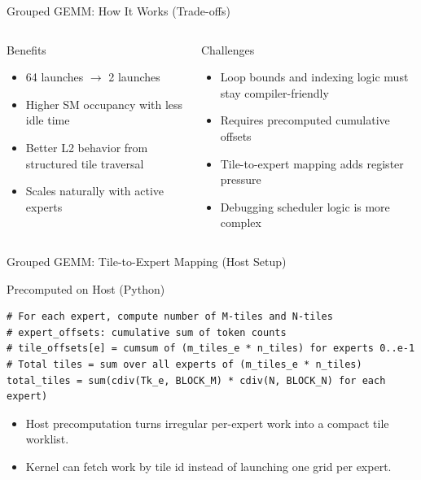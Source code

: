 \documentclass[aspectratio=169,11pt]{beamer}
\begin{document}
\begin{frame}[t]{Grouped GEMM: How It Works (Trade-offs)}
\begin{columns}[T]
\begin{block}{Benefits}
\begin{itemize}
    \item 64 launches $\to$ 2 launches
    \item Higher SM occupancy with less idle time
    \item Better L2 behavior from structured tile traversal
    \item Scales naturally with active experts
\end{itemize}
\end{block}

\begin{alertblock}{Challenges}
\begin{itemize}
    \item Loop bounds and indexing logic must stay compiler-friendly
    \item Requires precomputed cumulative offsets
    \item Tile-to-expert mapping adds register pressure
    \item Debugging scheduler logic is more complex
\end{itemize}
\end{alertblock}
\end{columns}
\end{frame}

\begin{frame}[fragile,t]{Grouped GEMM: Tile-to-Expert Mapping (Host Setup)}
\small
\begin{block}{Precomputed on Host (Python)}
\begin{lstlisting}[basicstyle=\ttfamily\scriptsize]
# For each expert, compute number of M-tiles and N-tiles
# expert_offsets: cumulative sum of token counts
# tile_offsets[e] = cumsum of (m_tiles_e * n_tiles) for experts 0..e-1
# Total tiles = sum over all experts of (m_tiles_e * n_tiles)
total_tiles = sum(cdiv(Tk_e, BLOCK_M) * cdiv(N, BLOCK_N) for each expert)
\end{lstlisting}
\end{block}

\begin{itemize}
    \item Host precomputation turns irregular per-expert work into a compact tile worklist.
    \item Kernel can fetch work by tile id instead of launching one grid per expert.
\end{itemize}
\end{frame}
\end{document}
